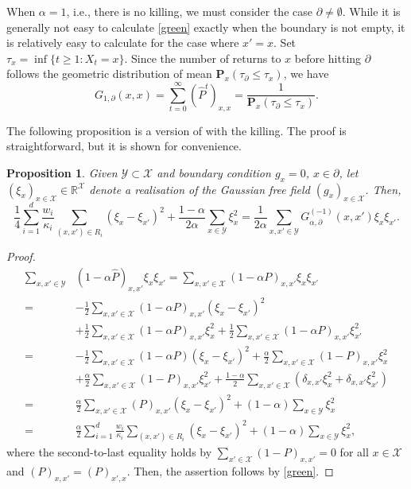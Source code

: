 \documentclass[a4paper,11pt]{article}
\theoremstyle{plain}
\newtheorem{proposition}[theorem]{Proposition}
\theoremstyle{definition}
\begin{document}
When $\alpha=1$, i.e., there is no killing,
we must consider the case $\partial\neq\emptyset$.
While it is generally not easy to calculate
\eqref{green} exactly when the boundary is
not empty, it is relatively easy to calculate
for the case where $x'=x$. Set
$\tau_x=\inf\{t\ge 1:X_t=x\}$. Since the number
of returns to $x$ before hitting $\partial$
follows the geometric distribution of mean
$\mathbf{P}_x(\tau_\partial\le\tau_x)$, we have
\begin{equation}\label{green1}
  G_{1,\partial}(x,x)
  =\sum_{t=0}^\infty(\hat{P}^t)_{x,x}
  =\frac{1}{\mathbf{P}_x(\tau_\partial\le \tau_x)}.
\end{equation}

The following proposition is a version of
\cite[Proposition 1.8]{BP25} with the killing.
The proof is straightforward, but it is shown
for convenience.

\begin{proposition}
  Given $\mathcal{Y}\subset \mathcal{X}$ and
  boundary condition $g_x=0$, $x\in\partial$,
  let
  $(\xi_x)_{x\in\mathcal{X}}\in\mathbb{R}^\mathcal{X}$
  denote a realisation of the Gaussian
  free field $(g_x)_{x\in\mathcal{X}}$. Then,
  \begin{equation*}
    \frac{1}{4}\sum_{i=1}^d\frac{w_i}{\kappa_i}
    \sum_{(x,x')\in R_i}(\xi_x-\xi_{x'})^2
    +\frac{1-\alpha}{2\alpha}\sum_{x\in\mathcal{Y}}\xi_x^2
    =\frac{1}{2\alpha}\sum_{x,x'\in\mathcal{Y}}
    G_{\alpha,\partial}^{(-1)}(x,x')\xi_x\xi_{x'}.
  \end{equation*}
\end{proposition}

\begin{proof}
\begin{align*}  
  \sum_{x,x'\in\mathcal{Y}}
  &(1-\alpha\hat{P})_{x,x'}\xi_x\xi_{x'}
  =\sum_{x,x'\in\mathcal{X}}(1-\alpha P)_{x,x'}\xi_x\xi_{x'}\\
  =&-\frac{1}{2}\sum_{x,x'\in\mathcal{X}}
  (1-\alpha P)_{x,x'}(\xi_x-\xi_{x'})^2\\
  &+\frac{1}{2}\sum_{x,x'\in\mathcal{X}}
  (1-\alpha P)_{x,x'}\xi_x^2
  +\frac{1}{2}\sum_{x,x'\in\mathcal{X}}
  (1-\alpha P)_{x,x'}\xi_{x'}^2\\
  =&-\frac{1}{2}\sum_{x,x'\in\mathcal{X}}
  (1-\alpha P)(\xi_x-\xi_{x'})^2
  +\frac{\alpha}{2}\sum_{x,x'\in\mathcal{X}}
  (1-P)_{x,x'}\xi_x^2\\
  &+\frac{\alpha}{2}\sum_{x,x'\in\mathcal{X}}
  (1-P)_{x,x'}\xi_{x'}^2
  +\frac{1-\alpha}{2}\sum_{x,x'\in\mathcal{X}}
  (\delta_{x,x'}\xi_x^2+\delta_{x,x'}\xi_{x'}^2)\\
  =&\frac{\alpha}{2}\sum_{x,x'\in\mathcal{X}}
  (P)_{x,x'}(\xi_x-\xi_{x'})^2
  +(1-\alpha)\sum_{x\in\mathcal{Y}}\xi_x^2\\
  =&\frac{\alpha}{2}\sum_{i=1}^d
  \frac{w_i}{\kappa_i}\sum_{(x,x')\in R_i}
  (\xi_x-\xi_{x'})^2
  +(1-\alpha)\sum_{x\in\mathcal{Y}}\xi_x^2,
\end{align*}
where the second-to-last equality holds by
$\sum_{x'\in\mathcal{X}}(1-P)_{x,x'}=0$ for all
$x\in\mathcal{X}$ and $(P)_{x,x'}=(P)_{x',x}$.
Then, the assertion follows by \eqref{green}.
\end{proof}
\end{document}
